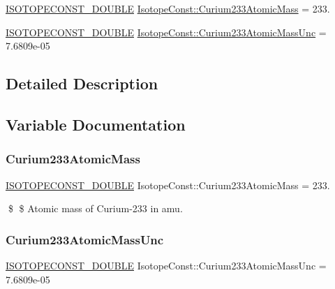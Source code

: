 \begin{DoxyCompactItemize}
\item 
\mbox{\hyperlink{group___isotope_const-_macros_ga8f45a7272ce02c0b4c65c44636ed719a}{I\+S\+O\+T\+O\+P\+E\+C\+O\+N\+S\+T\+\_\+\+D\+O\+U\+B\+LE}} \mbox{\hyperlink{group___isotope_const-_curium-_cm233_ga7410f858876bf885f09186fc4fd6f089}{Isotope\+Const\+::\+Curium233\+Atomic\+Mass}} = 233.
\item 
\mbox{\hyperlink{group___isotope_const-_macros_ga8f45a7272ce02c0b4c65c44636ed719a}{I\+S\+O\+T\+O\+P\+E\+C\+O\+N\+S\+T\+\_\+\+D\+O\+U\+B\+LE}} \mbox{\hyperlink{group___isotope_const-_curium-_cm233_gaa788de6fc8fd167c55508b3faa478304}{Isotope\+Const\+::\+Curium233\+Atomic\+Mass\+Unc}} = 7.\+6809e-\/05
\end{DoxyCompactItemize}


\subsection{Detailed Description}


\subsection{Variable Documentation}
\mbox{\label{group___isotope_const-_curium-_cm233_ga7410f858876bf885f09186fc4fd6f089}} 
\subsubsection{\texorpdfstring{Curium233\+Atomic\+Mass}{Curium233AtomicMass}}
{\footnotesize\ttfamily \mbox{\hyperlink{group___isotope_const-_macros_ga8f45a7272ce02c0b4c65c44636ed719a}{I\+S\+O\+T\+O\+P\+E\+C\+O\+N\+S\+T\+\_\+\+D\+O\+U\+B\+LE}} Isotope\+Const\+::\+Curium233\+Atomic\+Mass = 233.}

\$ \$ Atomic mass of Curium-\/233 in amu. \mbox{\label{group___isotope_const-_curium-_cm233_gaa788de6fc8fd167c55508b3faa478304}} 
\subsubsection{\texorpdfstring{Curium233\+Atomic\+Mass\+Unc}{Curium233AtomicMassUnc}}
{\footnotesize\ttfamily \mbox{\hyperlink{group___isotope_const-_macros_ga8f45a7272ce02c0b4c65c44636ed719a}{I\+S\+O\+T\+O\+P\+E\+C\+O\+N\+S\+T\+\_\+\+D\+O\+U\+B\+LE}} Isotope\+Const\+::\+Curium233\+Atomic\+Mass\+Unc = 7.\+6809e-\/05}

